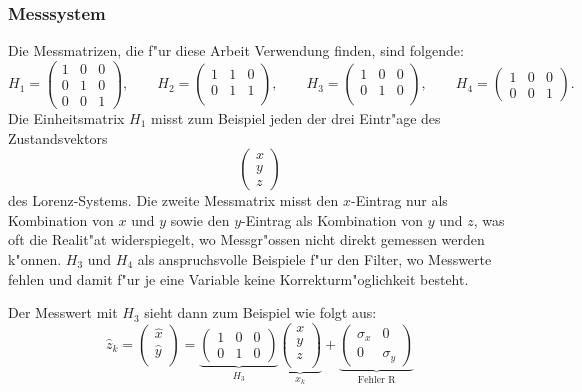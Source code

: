 \begin{refsection}
\subsubsection{Messsystem}
Die Messmatrizen, die f"ur diese Arbeit Verwendung finden, sind folgende:
\[H_{1}=\begin{pmatrix}
1 & 0 & 0 \\ 
0 & 1 & 0 \\ 
0 & 0 & 1
\end{pmatrix},\qquad
H_{2}=\begin{pmatrix}
1 & 1 & 0 \\ 
0 & 1 & 1 \\ 
\end{pmatrix},\qquad
H_{3}=\begin{pmatrix}
1 & 0 & 0 \\ 
0 & 1 & 0 \\ 
\end{pmatrix},\qquad
H_{4}=\begin{pmatrix}
1 & 0 & 0 \\  
0 & 0 & 1
\end{pmatrix}.
\]
Die Einheitsmatrix $H_{1}$ misst zum Beispiel jeden der drei Eintr"age des
Zustandsvektors
\[
\begin{pmatrix}
x\\
y\\
z
\end{pmatrix}
\]
des Lorenz-Systems.
Die zweite Messmatrix misst den $x$-Eintrag nur als Kombination von $x$ und $y$ sowie den $y$-Eintrag als Kombination von $y$ und $z$, was oft die Realit"at widerspiegelt, wo Messgr"ossen nicht direkt gemessen werden k"onnen. $H_{3}$ und $H_{4}$ als anspruchsvolle Beispiele f"ur den Filter, wo Messwerte fehlen und damit f"ur je eine Variable keine Korrekturm"oglichkeit besteht.

Der Messwert mit $H_{3}$ sieht dann zum Beispiel wie folgt aus:
\[\hat{z}_{k}=
\begin{pmatrix}
\hat{x} \\
\hat{y} \\
\end{pmatrix}= 
\underbrace{\begin{pmatrix}
1 & 0 & 0  \\
0 & 1 & 0
\end{pmatrix}}_{H_{3}}
\underbrace{\begin{pmatrix}
x \\
y \\
z \\
\end{pmatrix}
}_{x_{k}}
+
\underbrace{\begin{pmatrix}
\sigma_{x} & 0 \\
0 & \sigma_{y}
\end{pmatrix}}_{\text{Fehler R}}
\]


\end{refsection}
